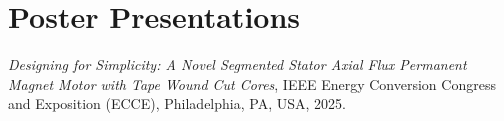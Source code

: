 \section{\sc Poster Presentations}

\begin{description}[font=\normalfont, labelwidth=1.5em, leftmargin=2em, itemsep=0.5em]

\item[P1] \emph{Designing for Simplicity: A Novel Segmented Stator Axial Flux Permanent Magnet Motor with Tape Wound Cut Cores}, IEEE Energy Conversion Congress and Exposition (ECCE), Philadelphia, PA, USA, 2025.

\end{description}

\endinput
